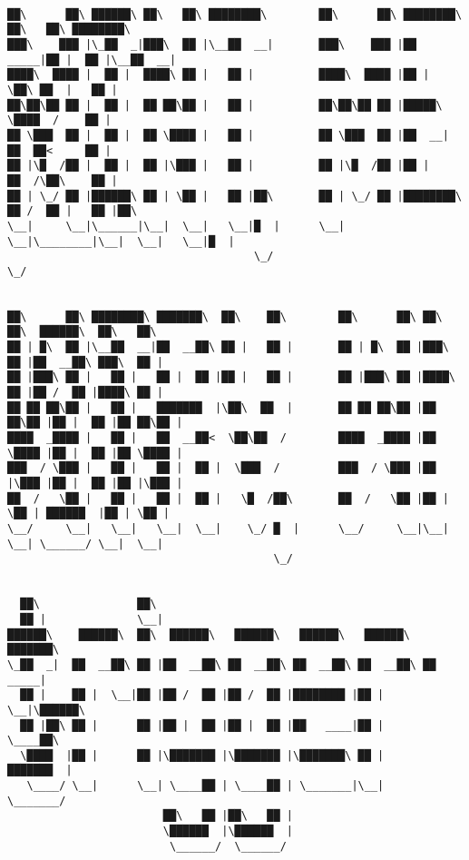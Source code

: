 \documentclass[varwidth=\maxdimen,margin=0.5cm,multi={verbatim}]{standalone}
\begin{document}
\begin{verbatim}

██\      ██\ ██████\ ██\   ██\ ████████\        ██\      ██\ ████████\ ██\   ██\ ████████\
███\    ███ |\_██  _|███\  ██ |\__██  __|       ███\    ███ |██  _____|██ |  ██ |\__██  __|
████\  ████ |  ██ |  ████\ ██ |   ██ |          ████\  ████ |██ |      \██\ ██  |   ██ |
██\██\██ ██ |  ██ |  ██ ██\██ |   ██ |          ██\██\██ ██ |█████\     \████  /    ██ |
██ \███  ██ |  ██ |  ██ \████ |   ██ |          ██ \███  ██ |██  __|    ██  ██<     ██ |
██ |\█  /██ |  ██ |  ██ |\███ |   ██ |          ██ |\█  /██ |██ |      ██  /\██\    ██ |
██ | \_/ ██ |██████\ ██ | \██ |   ██ |██\       ██ | \_/ ██ |████████\ ██ /  ██ |   ██ |██\
\__|     \__|\______|\__|  \__|   \__|█  |      \__|     \__|\________|\__|  \__|   \__|█  |
                                      \_/                                               \_/


██\      ██\ ████████\ ███████\  ██\    ██\        ██\      ██\ ██\   ██\  ██████\  ██\   ██\
██ | █\  ██ |\__██  __|██  __██\ ██ |   ██ |       ██ | █\  ██ |███\  ██ |██  __██\ ███\  ██ |
██ |███\ ██ |   ██ |   ██ |  ██ |██ |   ██ |       ██ |███\ ██ |████\ ██ |██ /  ██ |████\ ██ |
██ ██ ██\██ |   ██ |   ███████  |\██\  ██  |       ██ ██ ██\██ |██ ██\██ |██ |  ██ |██ ██\██ |
████  _████ |   ██ |   ██  __██<  \██\██  /        ████  _████ |██ \████ |██ |  ██ |██ \████ |
███  / \███ |   ██ |   ██ |  ██ |  \███  /         ███  / \███ |██ |\███ |██ |  ██ |██ |\███ |
██  /   \██ |   ██ |   ██ |  ██ |   \█  /██\       ██  /   \██ |██ | \██ | ██████  |██ | \██ |
\__/     \__|   \__|   \__|  \__|    \_/ █  |      \__/     \__|\__|  \__| \______/ \__|  \__|
                                         \_/


  ██\               ██\
  ██ |              \__|
██████\    ██████\  ██\  ██████\   ██████\   ██████\   ██████\   ███████\
\_██  _|  ██  __██\ ██ |██  __██\ ██  __██\ ██  __██\ ██  __██\ ██  _____|
  ██ |    ██ |  \__|██ |██ /  ██ |██ /  ██ |████████ |██ |  \__|\██████\
  ██ |██\ ██ |      ██ |██ |  ██ |██ |  ██ |██   ____|██ |       \____██\
  \████  |██ |      ██ |\███████ |\███████ |\███████\ ██ |      ███████  |
   \____/ \__|      \__| \____██ | \____██ | \_______|\__|      \_______/
                        ██\   ██ |██\   ██ |
                        \██████  |\██████  |
                         \______/  \______/



\end{verbatim}
\end{document}
